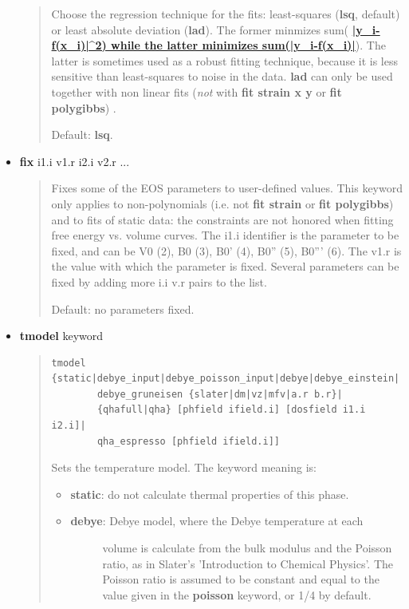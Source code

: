 \documentclass[a4paper]{article}
\begin{document}
\begin{itemize}
\begin{quote}
Choose the regression technique for the fits: least-squares
(\textbf{lsq}, default) or least absolute deviation (\textbf{lad}). The
former minmizes sum(%
\hyperlink{id11}{\textbf{\color{red}|y\_i-f(x\_i)|\textasciicircum{}2) while the latter minimizes
sum(|y\_i-f(x\_i)|}}). The latter is sometimes used as a robust fitting
technique, because it is less sensitive than least-squares to noise
in the data. \textbf{lad} can only be used together with non linear
fits (\emph{not} with \textbf{fit strain x y} or \textbf{fit polygibbs}) .

Default: \textbf{lsq}.

\end{quote}

\item \textbf{fix} i1.i v1.r i2.i v2.r ...
%
\begin{quote}

Fixes some of the EOS parameters to user-defined values. This
keyword only applies to non-polynomials (i.e. not \textbf{fit strain} or
\textbf{fit polygibbs}) and to fits of static data: the constraints are
not honored when fitting free energy vs. volume curves. The i1.i
identifier is the parameter to be fixed, and can be V0 (2), B0 (3),
B0' (4), B0'' (5), B0''' (6). The v1.r is the value with which the
parameter is fixed. Several parameters can be fixed by adding more
i.i v.r pairs to the list.

Default: no parameters fixed.

\end{quote}

\item \textbf{tmodel} keyword
%
\begin{quote}
%
\gibbslist
\begin{lstlisting}
tmodel {static|debye_input|debye_poisson_input|debye|debye_einstein|
        debye_gruneisen {slater|dm|vz|mfv|a.r b.r}|
        {qhafull|qha} [phfield ifield.i] [dosfield i1.i i2.i]|
        qha_espresso [phfield ifield.i]]
\end{lstlisting}

Sets the temperature model. The keyword meaning is:
%
\begin{itemize}

\item \textbf{static}: do not calculate thermal properties of this phase.

\item %
\begin{description}
\item[{\textbf{debye}: Debye model, where the Debye temperature at each}] \leavevmode 
volume is calculate from the bulk modulus and the Poisson
ratio, as in Slater's 'Introduction to Chemical Physics'. The
Poisson ratio is assumed to be constant and equal to the value
given in the \textbf{poisson} keyword, or 1/4 by default.


\end{description}
\end{itemize}
\end{quote}
\end{itemize}
\end{document}
